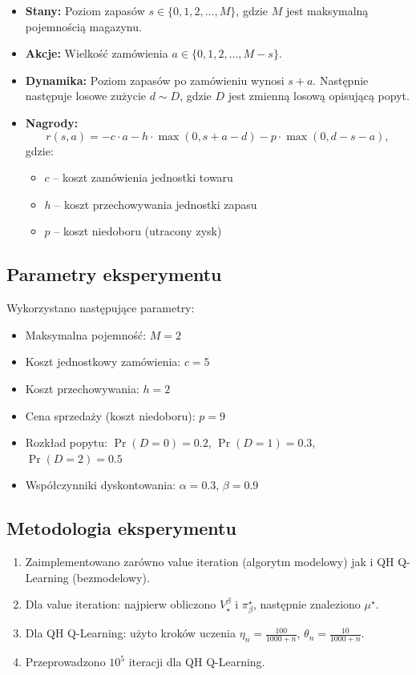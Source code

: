 \begin{itemize}
\item \textbf{Stany:} Poziom zapasów $s \in \{0, 1, 2, \ldots, M\}$, gdzie $M$ jest maksymalną pojemnością magazynu.
\item \textbf{Akcje:} Wielkość zamówienia $a \in \{0, 1, 2, \ldots, M - s\}$.
\item \textbf{Dynamika:} Poziom zapasów po zamówieniu wynosi $s + a$. Następnie następuje losowe zużycie $d \sim D$, gdzie $D$ jest zmienną losową opisującą popyt.
\item \textbf{Nagrody:} 
\[
r(s, a) = -c \cdot a - h \cdot \max(0, s + a - d) - p \cdot \max(0, d - s - a),
\]
gdzie:
\begin{itemize}
\item $c$ -- koszt zamówienia jednostki towaru
\item $h$ -- koszt przechowywania jednostki zapasu
\item $p$ -- koszt niedoboru (utracony zysk)
\end{itemize}
\end{itemize}

\subsection{Parametry eksperymentu}

Wykorzystano następujące parametry:

\begin{itemize}
\item Maksymalna pojemność: $M = 2$
\item Koszt jednostkowy zamówienia: $c = 5$
\item Koszt przechowywania: $h = 2$
\item Cena sprzedaży (koszt niedoboru): $p = 9$
\item Rozkład popytu: $\Pr(D = 0) = 0.2$, $\Pr(D = 1) = 0.3$, $\Pr(D = 2) = 0.5$
\item Współczynniki dyskontowania: $\alpha = 0.3$, $\beta = 0.9$
\end{itemize}

\subsection{Metodologia eksperymentu}

\begin{enumerate}
\item Zaimplementowano zarówno value iteration (algorytm modelowy) jak i QH Q-Learning (bezmodelowy).
\item Dla value iteration: najpierw obliczono $V^{\beta}_\star$ i $\pi^\star_\beta$, następnie znaleziono $\mu^\star$.
\item Dla QH Q-Learning: użyto kroków uczenia $\eta_n = \frac{100}{1000 + n}$, $\theta_n = \frac{10}{1000 + n}$.
\item Przeprowadzono $10^5$ iteracji dla QH Q-Learning.
\end{enumerate}

